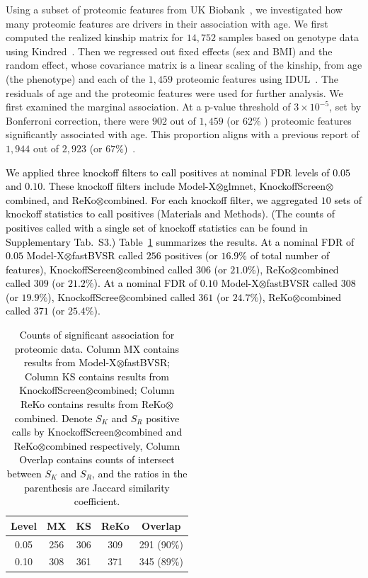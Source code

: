 \documentclass[12pt,Times]{article}
\def\cite{\citep}
\def\tcb{\textcolor{black}}
\begin{document}
Using a subset of proteomic features from UK Biobank~\cite{sun.etal.23}, we investigated how many proteomic features are drivers in their association with age. We first computed the realized kinship matrix for $14,752$ samples based on genotype data using Kindred~\cite{kindred}. Then we regressed out fixed effects (sex and BMI) and the random effect, whose covariance matrix is a linear scaling of the kinship, from age (the phenotype) and each of the $1,459$ proteomic features using IDUL~\cite{idul}.  The residuals of age and the proteomic features were used for further analysis.  We first examined the marginal association. At a p-value threshold of $3\times10^{-5}$, set by Bonferroni correction, there were $902$ out of $1,459$ (or $62\%$ ) proteomic features significantly associated with age. 
This proportion aligns with a previous report of $1,944$ out of $2,923$ (or $67\%$)~\cite{sun.etal.23}.   


\tcb{We applied three knockoff filters to call positives at nominal FDR levels of $0.05$ and $0.10$.  These knockoff filters include Model-X\allowbreak$\otimes$glmnet, KnockoffScreen\allowbreak$\otimes$combined, and ReKo\allowbreak$\otimes$combined.  For each knockoff filter, we aggregated $10$ sets of knockoff statistics to call positives (Materials and Methods). (The counts of positives called with a single set of knockoff statistics can be found in Supplementary Tab.~S3.)   
Table~\ref{combined} summarizes the results.  At a nominal FDR of $0.05$ Model-X\allowbreak$\otimes$fastBVSR called $256$ positives (or $16.9\%$ of total number of features),  KnockoffScreen\allowbreak$\otimes$combined called $306$ (or $21.0\%$),  ReKo$\otimes$combined called $309$ (or $21.2\%$).  At a nominal FDR of $0.10$ Model-X\allowbreak$\otimes$fastBVSR called $308$ (or $19.9\%$),  KnockoffScree\allowbreak$\otimes$combined called $361$ (or $24.7\%$), ReKo\allowbreak$\otimes$combined called $371$ (or $25.4\%$). }


\begin{table}[H]
\begin{center}
\begin{tabular}{ccccc}
Level & MX &   KS & ReKo & Overlap\\
\hline 
 0.05 &256&306 & 309 & 291 (90\%)\\
 0.10 &308 & 361 & 371 & 345  (89\%)\\
\hline
\end{tabular}
\end{center}
\vspace{-0.1in}
\caption{\tcb{Counts of significant association for proteomic data. Column MX contains results from Model-X\allowbreak$\otimes$fastBVSR; Column KS contains results from KnockoffScreen\allowbreak$\otimes$combined; Column ReKo contains results from ReKo\allowbreak$\otimes$combined. Denote $S_K$ and $S_R$ positive calls by KnockoffScreen$\otimes$combined and ReKo$\otimes$combined respectively, Column Overlap contains counts of intersect between $S_K$ and $S_R$, and the ratios in the parenthesis are Jaccard similarity coefficient.}}
\label{combined}
\vspace{-0.1in}
\end{table}%
\end{document}
